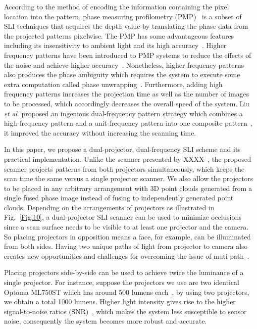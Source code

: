 \documentclass[]{spie}  %
\begin{document}
According to the method of encoding the information containing the pixel location into the pattern, phase measuring profilometry (PMP)~\cite{srin85} is a subset of SLI techniques that acquires the depth value by translating the phase data from the projected patterns pixelwise. The PMP has some advantageous features including its insensitivity to ambient light and its high accuracy~\cite{guan03, hali89}. Higher frequency patterns have been introduced to PMP systems to reduce the effects of the noise and achieve higher accuracy~\cite{lijl03}. Nonetheless, higher frequency patterns also produces the phase ambiguity which requires the system to execute some extra computation called phase unwrapping~\cite{song18}. Furthermore, adding high frequency patterns increases the projection time as well as the number of images to be processed, which accordingly decreases the overall speed of the system. Liu \textit{et al}. proposed an ingenious dual-frequency pattern strategy which combines a high-frequency pattern and a unit-frequency pattern into one composite pattern~\cite{liuk10}, it improved the accuracy without increasing the scanning time.

In this paper, we propose a dual-projector, dual-frequency SLI scheme and its practical implementation. Unlike the scanner presented by XXXX~\cite{??}, the proposed scanner projects patterns from both projectors simultaneously, which keeps the scan time the same versus a single projector scanner.  We also allow the projectors to be placed in any arbitrary arrangement with 3D point clouds generated from a single fused phase image instead of fusing to independently generated point clouds. Depending on the arrangements of projectors as illustrated in Fig.~\ref{Fig:10}, a dual-projector SLI scanner can be used to minimize occlusions~\cite{linj13} since a scan surface needs to be visible to at least one projector and the camera.  So placing projectors in opposition means a face, for example, can be illuminated from both sides.  Having two unique paths of light from projector to camera also creates new opportunities and challenges for overcoming the issue of muti-path~\cite{otoo16}. 

Placing projectors side-by-side can be used to achieve twice the luminance of a single projector. For instance, suppose the projectors we use are two identical Optoma ML750ST which has around 500 lumens each~\cite{lume70}, by using two projectors, we obtain a total 1000 lumens. Higher light intensity gives rise to the higher signal-to-noise ratios (SNR)~\cite{wangy10}, which makes the system less susceptible to sensor noise, consequently the system becomes more robust and accurate.
\end{document}
